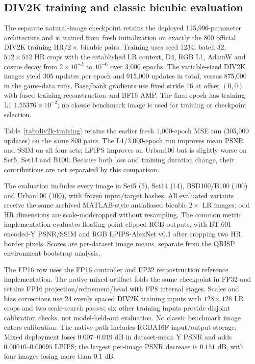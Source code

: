 \documentclass[10pt,twocolumn,letterpaper]{article}
\begin{document}
\subsection{DIV2K training and classic bicubic evaluation}
\label{sec:classic-bicubic}
The separate natural-image checkpoint retains the deployed 115,996-parameter architecture and is trained from fresh initialization on exactly the 800 official DIV2K training HR/$2\times$ bicubic pairs.
Training uses seed 1234, batch 32, $512\times512$ HR crops with the established LR context, D4, RGB L1, AdamW and cosine decay from $2\times10^{-3}$ to $10^{-6}$ over 3,000 epochs.
The variable-sized DIV2K images yield 305 updates per epoch and 915,000 updates in total, versus 875,000 in the game-data runs.
Base/bank gradients use fixed stride 16 at offset $(0,0)$ with fused training reconstruction and BF16 AMP.
The final epoch has training L1 $1.55376\times10^{-2}$; no classic benchmark image is used for training or checkpoint selection.

Table~\ref{tab:div2k-training} retains the earlier fresh 1,000-epoch MSE run (305,000 updates) on the same 800 pairs.
The L1/3,000-epoch run improves mean PSNR and SSIM on all four sets; LPIPS improves on Urban100 but is slightly worse on Set5, Set14 and B100.
Because both loss and training duration change, their contributions are not separated by this comparison.



The evaluation includes every image in Set5 (5), Set14 (14), BSD100/B100 (100) and Urban100 (100), with frozen input/target hashes.
All evaluated variants receive the same archived MATLAB-style antialiased bicubic $2\times$ LR images; odd HR dimensions are scale-modcropped without resampling.
The common metric implementation evaluates floating-point clipped RGB outputs, with BT.601 encoded-Y PSNR/SSIM and RGB LPIPS-AlexNet v0.1 after cropping two HR border pixels.
Scores are per-dataset image means, separate from the QRISP environment-bootstrap analysis.

The FP16 row uses the FP16 controller and FP32 reconstruction reference implementation.
The native mixed artifact folds the same checkpoint in FP32 and retains FP16 projection/refinement/head with FP8 internal stages.
Scales and bias corrections use 24 evenly spaced DIV2K training inputs with $128\times128$ LR crops and two scale-search passes; six other training inputs provide disjoint calibration checks, not model-held-out evaluation.
No classic benchmark image enters calibration.
The native path includes RGBA16F input/output storage.
Mixed deployment loses $0.007$--$0.019$ dB in dataset-mean Y PSNR and adds $0.00010$--$0.00095$ LPIPS; the largest per-image PSNR decrease is $0.151$ dB, with four images losing more than $0.1$ dB.
\end{document}
